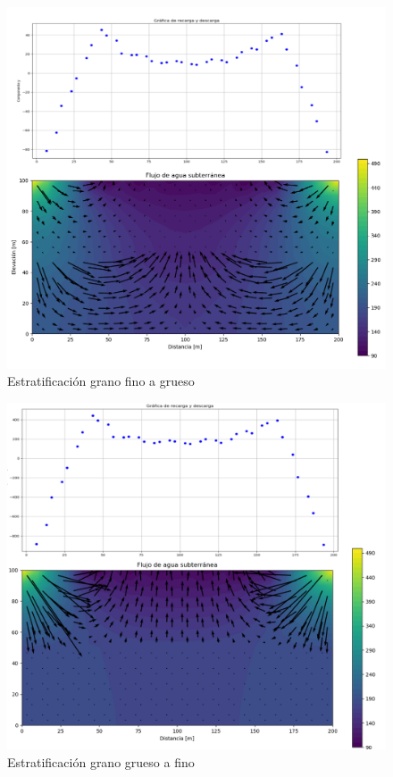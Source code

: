 \begin{figure}[h]
\centering
\includegraphics[scale=0.55]{Figura_35d.png}
\caption{ Estratificación grano fino a grueso}
\label{Figura3:7}
\end{figure}
 
\begin{figure}[H]
\centering
\includegraphics[scale=0.55]{Figura_36d.png}
\caption{ Estratificación grano grueso a fino}
\label{Figura3:8}
\end{figure}


